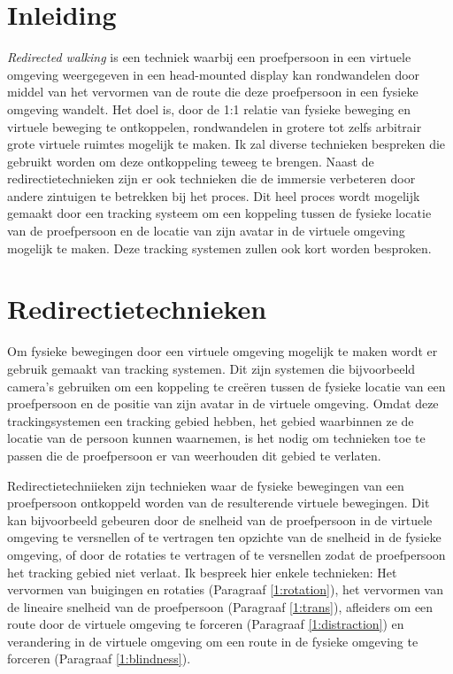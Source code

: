 \section{Inleiding}
\emph{Redirected walking} is een techniek waarbij een proefpersoon in een 
virtuele omgeving weergegeven in een head-mounted display kan rondwandelen door 
middel van het vervormen van de route die deze proefpersoon in een fysieke 
omgeving wandelt. Het doel is, door de 1:1 relatie van fysieke beweging en 
virtuele beweging te ontkoppelen, rondwandelen in grotere tot zelfs arbitrair 
grote virtuele ruimtes mogelijk te maken. Ik zal diverse technieken bespreken die
gebruikt worden om deze ontkoppeling teweeg te brengen. Naast de
redirectietechnieken zijn er ook technieken die de immersie verbeteren door
andere zintuigen te betrekken bij het proces. Dit heel proces wordt mogelijk 
gemaakt door een tracking systeem om een koppeling tussen de fysieke locatie van 
de proefpersoon en de locatie van zijn avatar in de virtuele omgeving mogelijk te
maken. Deze tracking systemen zullen ook kort worden besproken.


\section{Redirectietechnieken}
Om fysieke bewegingen door een virtuele omgeving mogelijk te maken wordt er
gebruik gemaakt van tracking systemen. Dit zijn systemen die bijvoorbeeld
camera's gebruiken om een koppeling te cre\"eren tussen de fysieke locatie van
een proefpersoon en de positie van zijn avatar in de virtuele omgeving. Omdat
deze trackingsystemen een tracking gebied hebben, het gebied waarbinnen ze de
locatie van de persoon kunnen waarnemen, is het nodig om technieken toe te passen
die de proefpersoon er van weerhouden dit gebied te verlaten.

Redirectietechniieken zijn technieken waar de fysieke bewegingen van een 
proefpersoon ontkoppeld worden van de resulterende virtuele bewegingen. Dit kan 
bijvoorbeeld gebeuren door de snelheid van de proefpersoon in de virtuele 
omgeving te versnellen of te vertragen ten opzichte van de snelheid in de fysieke
omgeving, of door de rotaties te vertragen of te versnellen zodat de proefpersoon
het tracking gebied niet verlaat. Ik bespreek hier enkele technieken: Het 
vervormen van buigingen en rotaties (Paragraaf \ref{1:rotation}), het vervormen van 
de lineaire snelheid van de proefpersoon (Paragraaf \ref{1:trans}), afleiders om
een route door de virtuele omgeving te forceren (Paragraaf \ref{1:distraction}) 
en verandering in de virtuele omgeving om een route in de fysieke omgeving te
forceren (Paragraaf \ref{1:blindness}).


